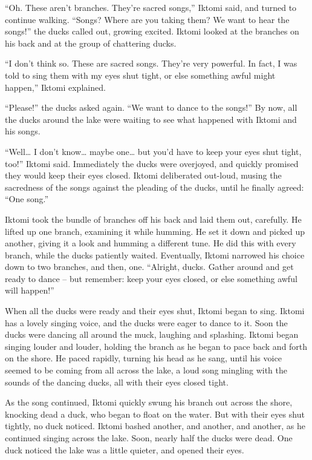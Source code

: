\documentclass[11pt]{article}
\begin{document}
\begin{itemize}
\begin{itemize}
“Oh. These aren’t branches. They’re sacred songs,” Iktomi said, and turned to continue walking. “Songs? Where are you taking them? We want to hear the songs!” the ducks called out, growing excited. Iktomi looked at the branches on his back and at the group of chattering ducks.

“I don’t think so. These are sacred songs. They’re very powerful. In fact, I was told to sing them with my eyes shut tight, or else something awful might happen,” Iktomi explained.

“Please!” the ducks asked again. “We want to dance to the songs!” By now, all the ducks around the lake were waiting to see what happened with Iktomi and his songs.

“Well… I don’t know… maybe one… but you’d have to keep your eyes shut tight, too!” Iktomi said. Immediately the ducks were overjoyed, and quickly promised they would keep their eyes closed. Iktomi deliberated out-loud, musing the sacredness of the songs against the pleading of the ducks, until he finally agreed: “One song.”

Iktomi took the bundle of branches off his back and laid them out, carefully. He lifted up one branch, examining it while humming. He set it down and picked up another, giving it a look and humming a different tune. He did this with every branch, while the ducks patiently waited. Eventually, Iktomi narrowed his choice down to two branches, and then, one. “Alright, ducks. Gather around and get ready to dance – but remember: keep your eyes closed, or else something awful will happen!”

When all the ducks were ready and their eyes shut, Iktomi began to sing. Iktomi has a lovely singing voice, and the ducks were eager to dance to it. Soon the ducks were dancing all around the muck, laughing and splashing. Iktomi began singing louder and louder, holding the branch as he began to pace back and forth on the shore. He paced rapidly, turning his head as he sang, until his voice seemed to be coming from all across the lake, a loud song mingling with the sounds of the dancing ducks, all with their eyes closed tight.

As the song continued, Iktomi quickly swung his branch out across the shore, knocking dead a duck, who began to float on the water. But with their eyes shut tightly, no duck noticed. Iktomi bashed another, and another, and another, as he continued singing across the lake. Soon, nearly half the ducks were dead. One duck noticed the lake was a little quieter, and opened their eyes.


\end{itemize}
\end{itemize}
\end{document}
